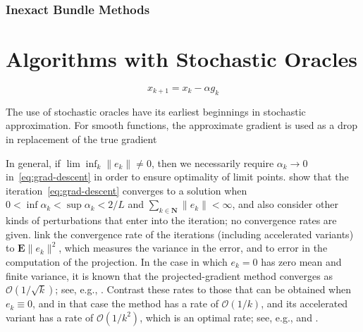 \subsubsection{Inexact Bundle Methods}

\subsubsection{}

\section{Algorithms with Stochastic Oracles}

\begin{equation}\label{eq:grad-descent}
x_{k+1} = x_k - \alpha g_k
\end{equation}

The use of stochastic oracles have its earliest beginnings in stochastic
approximation. For smooth functions, the approximate gradient is used
as a drop in replacement of the true gradient

In general, if $\lim\inf_{k} \|e_{k}\| \neq 0$, then we necessarily
require $\alpha_k\to0$ in~\eqref{eq:grad-descent} in order to ensure optimality
of limit points. \cite[Theorem~3.4]{ComWaj2005}
show that the iteration~\eqref{eq:grad-descent} converges to a solution when
$0<\inf\alpha_k<\sup\alpha_k<2/L$ and
$\sum_{k\in\mathbf{N}}\|{e_k}\|<\infty$, and also consider other kinds
of perturbations that enter into the iteration; no convergence rates
are given.  \cite{SchmidtRouxBach:2011} link
the convergence rate of the iterations (including accelerated
variants) to $\mathbf{E} \|e_{k}\|^{2}$, which measures the variance in the
error, and to error in the computation of the projection. In the case in
which $e_k=0$ has zero mean and finite variance, it is known that the
projected-gradient method converges as $\mathcal{O}(1/\sqrt k)$; see, e.g.,
\cite{Langford:2009:SOL:1577069.1577097}. Contrast these rates
to those that can be obtained when $e_k\equiv0$, and in that case the
method has a rate of $\mathcal{O}(1/k)$, and its accelerated variant has a
rate of $\mathcal{O}(1/k^2)$, which is an optimal rate; see, e.g.,
\cite{Nes07} and \cite{BeT08}.

